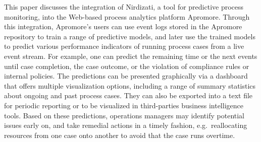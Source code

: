 This paper discusses the integration of Nirdizati, a tool for predictive process monitoring, into the Web-based process analytics platform Apromore. Through this integration, Apromore's users can use event logs stored in the Apromore repository to train a range of predictive models, and later use the trained models to predict various performance indicators of running process cases from a live event stream. For example, one can predict the remaining time or the next events until case completion, the case outcome, or the violation of compliance rules or internal policies. %
The predictions can be presented graphically via a dashboard that offers multiple visualization options, including a range of summary statistics about ongoing and past process cases. They can also be exported into a text file for periodic reporting or to be visualized in third-parties business intelligence tools. Based on these predictions, operations managers may identify potential issues early on, and take remedial actions in a timely fashion, e.g.\ reallocating resources from one case onto another to avoid that the case runs overtime. %
